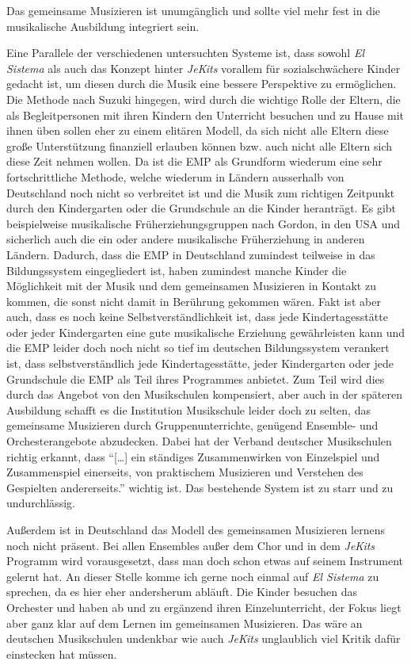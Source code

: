 
Das gemeinsame Musizieren ist
unumgänglich und sollte viel mehr fest in die musikalische Ausbildung integriert
sein.

Eine Parallele der verschiedenen untersuchten Systeme ist, dass sowohl \emph{El
Sistema} als auch das Konzept hinter \emph{JeKits} vorallem für sozialschwächere
Kinder gedacht ist, um diesen durch die Musik eine bessere Perspektive zu
ermöglichen. Die Methode nach Suzuki hingegen, wird durch die wichtige Rolle der
Eltern, die als Begleitpersonen mit ihren Kindern den Unterricht besuchen und zu
Hause mit ihnen üben sollen eher zu einem elitären Modell, da sich nicht alle
Eltern diese große Unterstützung finanziell erlauben können bzw. auch nicht alle
Eltern sich diese Zeit nehmen wollen. Da ist die EMP als Grundform wiederum eine
sehr fortschrittliche Methode, welche wiederum in Ländern ausserhalb von
Deutschland noch nicht so verbreitet ist und die Musik zum richtigen Zeitpunkt
durch den Kindergarten oder die Grundschule an die Kinder heranträgt. Es gibt
beispielweise musikalische Früherziehungsgruppen nach Gordon, in den USA und
sicherlich auch die ein oder andere musikalische Früherziehung in anderen
Ländern. Dadurch, dass die EMP in Deutschland zumindest teilweise in das
Bildungssystem eingegliedert ist, haben zumindest manche Kinder die Möglichkeit
mit der Musik und dem gemeinsamen Musizieren in Kontakt zu kommen, die sonst
nicht damit in Berührung gekommen wären. Fakt ist aber auch, dass es noch keine
Selbstverständlichkeit ist, dass jede Kindertagesstätte oder jeder Kindergarten
eine gute musikalische Erziehung gewährleisten kann und die EMP leider doch noch
nicht so tief im deutschen Bildungssystem verankert ist, dass selbstverständlich
jede Kindertagesstätte, jeder Kindergarten oder jede Grundschule die EMP als
Teil ihres Programmes anbietet. Zum Teil wird dies durch das Angebot von den
Musikschulen kompensiert, aber auch in der späteren Ausbildung schafft es die
Institution Musikschule leider doch zu selten, das gemeinsame Musizieren durch
Gruppenunterrichte, genügend Ensemble- und Orchesterangebote abzudecken. Dabei
hat der Verband deutscher Musikschulen richtig erkannt, dass \enquote{[…] ein
ständiges Zusammenwirken von Einzelspiel und Zusammenspiel einerseits, von
praktischem Musizieren und Verstehen des Gespielten andererseits.} wichtig ist.
\autocite[22]{losert:die_kunst_zu_unterrichten} Das bestehende System ist zu
starr und zu undurchlässig.

Außerdem ist in Deutschland das Modell des gemeinsamen Musizieren lernens noch nicht präsent. 
Bei allen Ensembles außer dem Chor und in
dem \emph{JeKits} Programm wird vorausgesetzt, dass man doch schon etwas auf seinem
Instrument gelernt hat. An dieser Stelle komme ich gerne noch einmal auf \emph{El
Sistema} zu sprechen, da es hier eher andersherum abläuft. Die Kinder besuchen
das Orchester und haben ab und zu ergänzend ihren Einzelunterricht, der Fokus
liegt aber ganz klar auf dem Lernen im gemeinsamen Musizieren. Das wäre an
deutschen Musikschulen undenkbar wie auch \emph{JeKits} unglaublich viel Kritik dafür
einstecken hat müssen.

